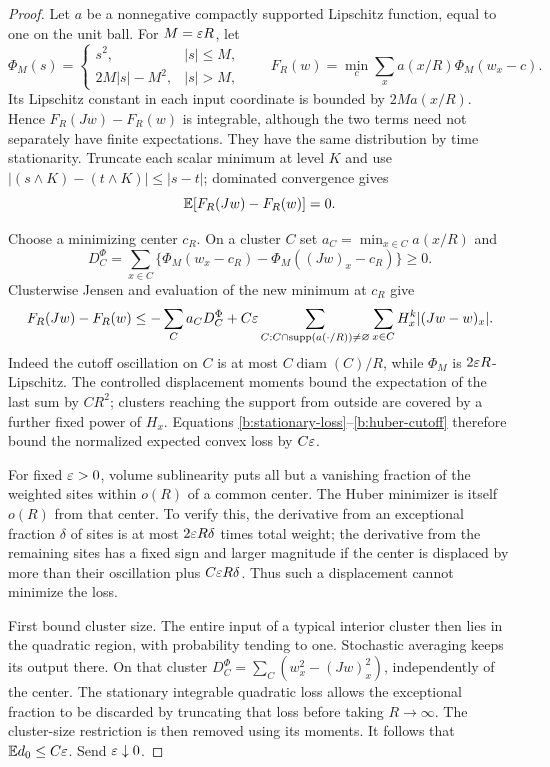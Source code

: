 \begin{proof}
Let $a$ be a nonnegative compactly supported Lipschitz function, equal to
one on the unit ball. For $M=\varepsilon R$, let
\[
 \Phi_M(s)=
 \begin{cases}s^2,&|s|\le M,\\2M|s|-M^2,&|s|>M,\end{cases}
 \qquad
 F_R(w)=\min_c\sum_x a(x/R)\Phi_M(w_x-c).
\]
Its Lipschitz constant in each input coordinate is bounded by
$2M a(x/R)$. Hence $F_R(Jw)-F_R(w)$ is integrable, although the two
terms need not separately have finite expectations. They have the same
distribution by time stationarity. Truncate each scalar minimum at level
$K$ and use
$|(s\wedge K)-(t\wedge K)|\le|s-t|$; dominated convergence gives
\begin{equation}\label{b:stationary-loss}
 \mathbb E[F_R(Jw)-F_R(w)]=0.
\end{equation}

Choose a minimizing center $c_R$. On a cluster $C$ set
$a_C=\min_{x\in C}a(x/R)$ and
\[
 D_C^\Phi=\sum_{x\in C}
    \{\Phi_M(w_x-c_R)-\Phi_M((Jw)_x-c_R)\}\ge0.
\]
Clusterwise Jensen and evaluation of the new minimum at $c_R$ give
\begin{equation}\label{b:huber-cutoff}
 F_R(Jw)-F_R(w)
 \le-\sum_C a_CD_C^\Phi
       +C\varepsilon\sum_{C:C\cap\operatorname{supp}(a(\cdot/R))\ne\varnothing}
             \sum_{x\in C}H_x^k|(Jw-w)_x|.
\end{equation}
Indeed the cutoff oscillation on $C$ is at most
$C\operatorname{diam}(C)/R$, while $\Phi_M$ is $2\varepsilon R$-Lipschitz.
The controlled displacement moments bound the expectation of the last
sum by $C R^2$; clusters reaching the support from outside are covered
by a further fixed power of $H_x$. Equations
\eqref{b:stationary-loss}--\eqref{b:huber-cutoff} therefore bound the
normalized expected convex loss by $C\varepsilon$.

For fixed $\varepsilon>0$, volume sublinearity puts all but a vanishing fraction
of the weighted sites within $o(R)$ of a common center. The Huber
minimizer is itself $o(R)$ from that center. To verify this, the derivative
from an exceptional fraction $\delta$ of sites is at most
$2\varepsilon R\delta$ times total weight; the derivative from the remaining
sites has a fixed sign and larger magnitude if the center is displaced
by more than their oscillation plus $C\varepsilon R\delta$. Thus such a
displacement cannot minimize the loss.

First bound cluster size. The entire input of a typical interior cluster
then lies in the quadratic region, with probability tending to one.
Stochastic averaging keeps its output there. On that cluster
$D_C^\Phi=\sum_C(w_x^2-(Jw)_x^2)$, independently of the center.
The stationary integrable quadratic loss allows the exceptional fraction
to be discarded by truncating that loss before taking $R\to\infty$.
The cluster-size restriction is then removed using its moments. It follows
that $\mathbb E d_0\le C\varepsilon$. Send $\varepsilon\downarrow0$.


\end{proof}
